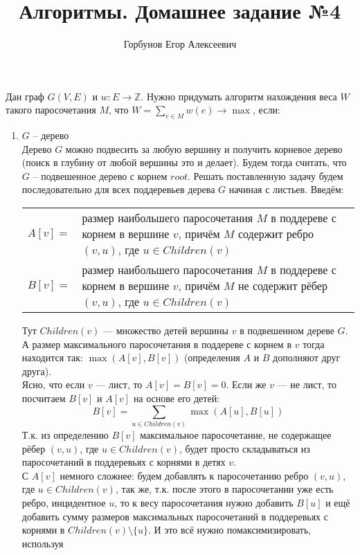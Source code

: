 
\title{Алгоритмы. Домашнее задание №4}
\author{Горбунов Егор Алексеевич}


\maketitle

Дан граф $G(V,E)$ и $w:E \rightarrow \mathbb{Z}$. Нужно придумать алгоритм нахождения веса $W$ такого паросочетания $M$, что
$W = \sum_{e\in M}{w(e)} \rightarrow \max$, если:
\begin{enumerate}[label=(\alph*)]
\item $G$ -- дерево\\
Дерево $G$ можно подвесить за любую вершину и получить корневое дерево (поиск в глубину от любой вершины это и делает).
Будем тогда считать, что $G$ -- подвешенное дерево с корнем $root$. Решать поставленную задачу будем последовательно 
для всех поддеревьев дерева $G$ начиная с листьев. Введём: \\
\begin{tabular}{lp{15cm}}
  $A[v]=$ & размер наибольшего паросочетания $M$ в поддереве с корнем в вершине $v$, причём $M$ содержит ребро $(v,u)$, 
  где $u\in Children(v)$\\
  $B[v]=$ & размер наибольшего паросочетания $M$ в поддереве с корнем в вершине $v$, причём $M$ не содержит рёбер $(v,u)$, 
  где $u\in Children(v)$\\
\end{tabular}
Тут $Children(v)$ --- множество детей вершины $v$ в подвешенном дереве $G$. А размер максимального паросочетания в поддереве
с корнем в $v$ тогда находится так: $\max(A[v],B[v])$ (определения $A$ и $B$ дополняют друг друга). \\
Ясно, что если $v$ --- лист, то $A[v]=B[v]=0$. Если же $v$ --- не лист, то посчитаем $B[v]$ и $A[v]$ на основе его детей:
\[ 
	B[v] =  \sum_{u\in Children(v)}{\max(A[u],B[u])} 
\]
Т.к. из определению $B[v]$ максимальное паросочетание, не содержащее рёбер $(v,u)$, где $u\in Children(v)$, будет просто
складываться из паросочетаний в поддеревьях с корнями в детях $v$.\\
С $A[v]$ немного сложнее: будем добавлять к паросочетанию ребро $(v,u)$, где $u\in Children(v)$, так же, т.к. после этого
в паросочетании уже есть ребро, инцидентное $u$, то к весу паросочетания нужно добавить $B[u]$ и ещё добавить сумму размеров
максимальных паросочетаний в поддеревьях с корнями в $Children(v)\setminus \lbrace u \rbrace$. И это всё нужно помаксимизировать, используя

\end{enumerate}
